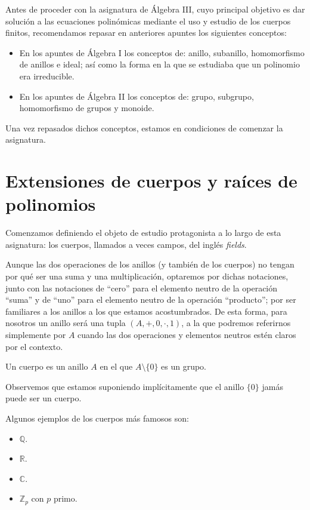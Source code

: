 Antes de proceder con la asignatura de Álgebra III, cuyo principal objetivo es dar solución a las ecuaciones polinómicas mediante el uso y estudio de los cuerpos finitos, recomendamos repasar en anteriores apuntes los siguientes conceptos:
\begin{itemize}
    \item En los apuntes de Álgebra I los conceptos de: anillo, subanillo, homomorfismo de anillos e ideal; así como la forma en la que se estudiaba que un polinomio era irreducible.
    \item En los apuntes de Álgebra II los conceptos de: grupo, subgrupo, homomorfismo de grupos y monoide.
\end{itemize}
Una vez repasados dichos conceptos, estamos en condiciones de comenzar la asignatura.

\chapter{Extensiones de cuerpos y raíces de polinomios}
\noindent
Comenzamos definiendo el objeto de estudio protagonista a lo largo de esta asignatura: los cuerpos, llamados a veces campos, del inglés \textit{fields}.

\begin{notacion}
    Aunque las dos operaciones de los anillos (y también de los cuerpos) no tengan por qué ser una suma y una multiplicación, optaremos por dichas notaciones, junto con las notaciones de ``cero'' para el elemento neutro de la operación ``suma'' y de ``uno'' para el elemento neutro de la operación ``producto''; por ser familiares a los anillos a los que estamos acostumbrados. De esta forma, para nosotros un anillo será una tupla $(A,+,0,\cdot,1)$, a la que podremos referirnos simplemente por $A$ cuando las dos operaciones y elementos neutros estén claros por el contexto.
\end{notacion}

\begin{definicion}[Cuerpo]
    Un cuerpo es un anillo $A$ en el que $A\setminus \{0\}$ es un grupo.
\end{definicion}

Observemos que estamos suponiendo implícitamente que el anillo $\{0\}$ jamás puede ser un cuerpo.

\begin{ejemplo}
    Algunos ejemplos de los cuerpos más famosos son:
    \begin{itemize}
        \item $\mathbb{Q}$.
        \item $\mathbb{R}$.
        \item $\mathbb{C}$.
        \item $\mathbb{Z}_p$ con $p$ primo.
    \end{itemize}
\end{ejemplo}

